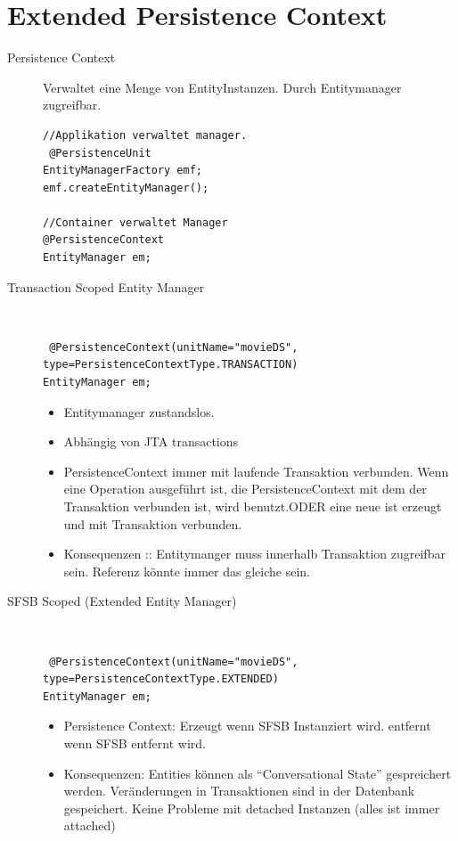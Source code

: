 \documentclass[a4paper,10pt]{scrreprt}
\begin{document}
\section{Extended Persistence Context}
\begin{description}
 \item [Persistence Context] Verwaltet eine Menge von EntityInstanzen. Durch Entitymanager zugreifbar.\\
 \begin{lstlisting}
//Applikation verwaltet manager.
 @PersistenceUnit
EntityManagerFactory emf;
emf.createEntityManager();

//Container verwaltet Manager
@PersistenceContext
EntityManager em;

 \end{lstlisting}
\item[Transaction Scoped Entity Manager] \hfill \\
\begin{lstlisting}
 @PersistenceContext(unitName="movieDS",
type=PersistenceContextType.TRANSACTION)
EntityManager em;
\end{lstlisting}
\begin{itemize}
 \item Entitymanager zustandslos.
 \item Abhängig von JTA transactions
 \item PersistenceContext immer mit laufende Transaktion verbunden.
 \subitem Wenn eine Operation ausgeführt ist, die PersistenceContext mit dem der Transaktion verbunden ist, wird 
benutzt.ODER eine neue ist erzeugt und mit Transaktion verbunden.
\item Konsequenzen :: Entitymanger muss innerhalb Transaktion zugreifbar sein. Referenz könnte immer das gleiche sein.
\end{itemize}
\item [SFSB Scoped (Extended Entity Manager) ] \hfill \\
\begin{lstlisting}
 @PersistenceContext(unitName="movieDS",
type=PersistenceContextType.EXTENDED)
EntityManager em;

\end{lstlisting}
\begin{itemize}
 \item Persistence Context:
  \subitem Erzeugt wenn SFSB Instanziert wird.
  \subitem entfernt wenn SFSB entfernt wird.
  \item Konsequenzen:
  \subitem Entities können als ``Conversational State'' gespreichert werden.
  \subitem Veränderungen in Transaktionen sind in der Datenbank gespeichert.
  \subitem Keine Probleme mit detached Instanzen (alles ist immer attached)
\end{itemize}

\end{description}
\end{document}

